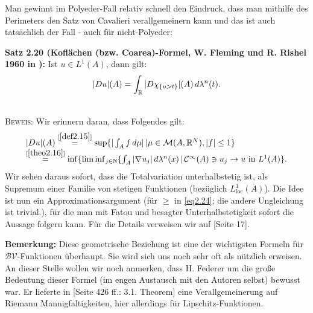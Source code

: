 Man gewinnt im Polyeder-Fall relativ schnell den Eindruck, dass man mithilfe des Perimeters den Satz von Cavalieri verallgemeinern kann und das ist auch tatsächlich der Fall - auch für nicht-Polyeder:\\[0.5cm]
\colorbox{generalYellow}{\begin{minipage}{16cm}{\textcolor{black}{}{\label{theo2.20}}}
\textbf{Satz 2.20 (Koflächen (bzw. Coarea)-Formel, W. Fleming und R. Rishel 1960 in \cite{fleming1960integral}):} Ist \(u \in L^1(A)\), dann gilt:
\begin{equation}{\label{eq2.24}}
    |Du|(A) = \int_{\mathbb{R}} |D \chi_{\{u > t\}}|(A) \, d\lambda^n(t).
\end{equation}
\end{minipage}}\\

\textsc{Beweis:} Wir erinnern daran, dass Folgendes gilt:
\begin{equation}{\label{eq2.25}}
\begin{array}{l}
    |Du|(A) \stackrel{[\ref{def2.15}]}{=} \sup \{|\int_A f \, d\mu| \, | \mu \in \mathcal{M}(A,\mathbb{R}^N), |f| \leq 1\} \\ \stackrel{[\ref{theo2.16}]}{=} \inf \{\liminf_{j \in \mathbb{N}} \{\int_A |\nabla u_j| \, d\lambda^n(x) \, | \, \mathcal{C}^{\infty}(A) \ni u_j \to u \text{ in }L^1(A)\}.
\end{array}
\end{equation}
Wir sehen daraus sofort, dass die Totalvariation unterhalbstetig ist, als Supremum einer Familie von stetigen Funktionen (bezüglich \(L^1_{\text{loc}}(A)\)). Die Idee ist nun ein Approximationsargument (für \(\geq\) in \eqref{eq2.24}; die andere Ungleichung ist trivial.), für die man mit Fatou und besagter Unterhalbstetigkeit sofort die Aussage folgern kann. Für die Details verweisen wir auf \cite{BraidesApprox}[Seite 17].\QEDB

\textbf{Bemerkung:} Diese geometrische Beziehung ist eine der wichtigsten Formeln für \(\mathcal{BV}\)-Funktionen überhaupt. Sie wird sich uns noch sehr oft als nützlich erweisen. An dieser Stelle wollen wir noch anmerken, dass H. Federer um die große Bedeutung dieser Formel (im engen Austausch mit den Autoren selbst) bewusst war. Er lieferte in \cite{federer1959curvature}[Seite 426 ff.: 3.1. Theorem] eine Verallgemeinerung auf Riemann Mannigfaltigkeiten, hier allerdings für Lipschitz-Funktionen.\\

